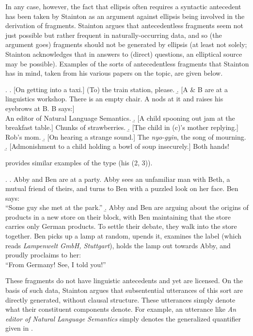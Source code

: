 \documentclass[doublespace]{umthesis}
\begin{document}
In any case, however, the fact that ellipsis often requires a syntactic antecedent has been taken by Stainton as an argument against ellipsis being involved in the derivation of fragments. Stainton argues that antecedentless fragments seem not just possible but rather frequent in naturally-occurring data, and so (the argument goes) fragments should not be generated by ellipsis (at least not solely; Stainton acknowledges that in answers to (direct) questions, an elliptical source may be possible). Examples of the sorts of antecedentless fragments that Stainton has in mind, taken from his various papers on the topic, are given below.

\ex.		\a. [On getting into a taxi.] (To) the train station, please.
		\b. [A \& B are at a linguistics workshop. There is an empty chair. A nods at it and raises his eyebrows at B. B says:]\\
			An editor of Natural Language Semantics.
		\b. [A child spooning out jam at the breakfast table.] Chunks of strawberries.
		\b. [The child in (c)'s mother replying.] Rob's mom.
		\b. [On hearing a strange sound.] The {\it nyo-gyin}, the song of mourning.
		\b. [Admonishment to a child holding a bowl of soup insecurely.] Both hands!

		
\cite{Me04} provides similar examples of the type (his (2, 3)).

\ex. 		\a. Abby and Ben are at a party. Abby sees an unfamiliar man with Beth, a mutual friend of theirs, and turns to Ben with a puzzled look on her face. Ben says:\\
		``Some guy she met at the park.''
		\b. Abby and Ben are arguing about the origins of products in a new store on their block, with Ben maintaining that the store carries only German products. To settle their debate, they walk into the store together. Ben picks up a lamp at random, upends it, examines the label (which reads {\it Lampenwelt GmbH, Stuttgart}), holds the lamp out towards Abby, and proudly proclaims to her:\\
		``From Germany! See, I told you!''
		
These fragments do not have linguistic antecedents and yet are licensed. On the basis of such data, Stainton argues that subsentential utterances of this sort are directly generated, without clausal structure. These utterances simply denote what their constituent components denote. For example, an utterance like {\it An editor of Natural Language Semantics} simply denotes the generalized quantifier given in \Next[b].
\end{document}
